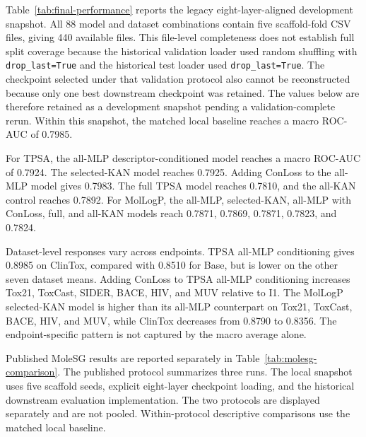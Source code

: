 \documentclass[journal=jcisd8,manuscript=article]{achemso}
\begin{document}
Table~\ref{tab:final-performance} reports the legacy eight-layer-aligned development snapshot. All 88 model and dataset combinations contain five scaffold-fold CSV files, giving 440 available files. This file-level completeness does not establish full split coverage because the historical validation loader used random shuffling with \texttt{drop\_last=True} and the historical test loader used \texttt{drop\_last=True}. The checkpoint selected under that validation protocol also cannot be reconstructed because only one best downstream checkpoint was retained. The values below are therefore retained as a development snapshot pending a validation-complete rerun. Within this snapshot, the matched local baseline reaches a macro ROC-AUC of 0.7985.

For TPSA, the all-MLP descriptor-conditioned model reaches a macro ROC-AUC of 0.7924. The selected-KAN model reaches 0.7925. Adding ConLoss to the all-MLP model gives 0.7983. The full TPSA model reaches 0.7810, and the all-KAN control reaches 0.7892. For MolLogP, the all-MLP, selected-KAN, all-MLP with ConLoss, full, and all-KAN models reach 0.7871, 0.7869, 0.7871, 0.7823, and 0.7824.

Dataset-level responses vary across endpoints. TPSA all-MLP conditioning gives 0.8985 on ClinTox, compared with 0.8510 for Base, but is lower on the other seven dataset means. Adding ConLoss to TPSA all-MLP conditioning increases Tox21, ToxCast, SIDER, BACE, HIV, and MUV relative to I1. The MolLogP selected-KAN model is higher than its all-MLP counterpart on Tox21, ToxCast, BACE, HIV, and MUV, while ClinTox decreases from 0.8790 to 0.8356. The endpoint-specific pattern is not captured by the macro average alone.

Published MoleSG results are reported separately in Table~\ref{tab:molesg-comparison}. The published protocol summarizes three runs. The local snapshot uses five scaffold seeds, explicit eight-layer checkpoint loading, and the historical downstream evaluation implementation. The two protocols are displayed separately and are not pooled. Within-protocol descriptive comparisons use the matched local baseline.
\end{document}
